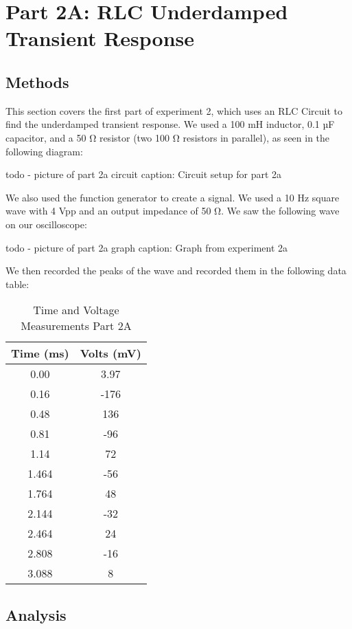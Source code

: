 \documentclass[11pt]{article}
\let\oldsection\section
\renewcommand\section{\clearpage\oldsection}
\begin{document}
    \section{Part 2A: RLC Underdamped Transient Response}\label{sec:part2a_underdamped}
    \subsection{Methods}\label{subsec:part2a_methods}
    This section covers the first part of experiment 2, which uses an RLC Circuit to find the underdamped transient response. We used a 100 mH inductor, 0.1 µF capacitor, and a 50 Ω resistor (two 100 Ω resistors in parallel), as seen in the following diagram:

    todo - picture of part 2a circuit
    caption: Circuit setup for part 2a

    We also used the function generator to create a signal. We used a 10 Hz square wave with 4 Vpp and an output impedance of 50 Ω. We saw the following wave on our oscilloscope:

    todo - picture of part 2a graph
    caption: Graph from experiment 2a

    We then recorded the peaks of the wave and recorded them in the following data table:

    \begin{table}[h]
    \centering
    \caption{Time and Voltage Measurements Part 2A}
    \begin{tabular}{cc}
    \toprule
    \textbf{Time (ms)} & \textbf{Volts (mV)} \\
    \midrule
    0.00 & 3.97 \\
    0.16 & -176 \\
    0.48 & 136 \\
    0.81 & -96 \\
    1.14 & 72 \\
    1.464 & -56 \\
    1.764 & 48 \\
    2.144 & -32 \\
    2.464 & 24 \\
    2.808 & -16 \\
    3.088 & 8 \\
    \bottomrule
    \end{tabular}
    \end{table}

    
    
    \subsection{Analysis}\label{subsec:part2a_analysis}
\end{document}

